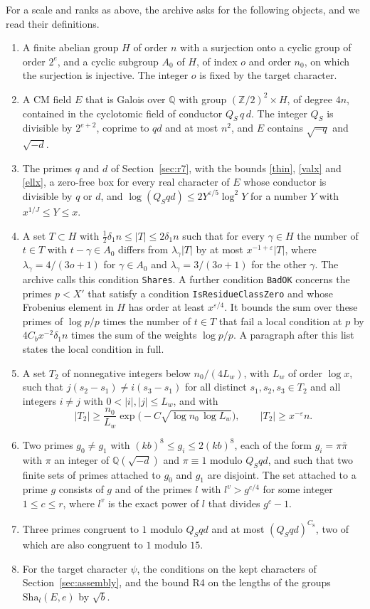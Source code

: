\documentclass[11pt,letterpaper]{article}
\numberwithin{equation}{section}
\newcommand{\Sha}{\mathrm{Sha}}
\begin{document}
For a scale and ranks as above, the archive asks for the following objects, and we read their definitions.
\begin{enumerate}
\item A finite abelian group $H$ of order $n$ with a surjection onto a cyclic group of order $2^e$, and a cyclic subgroup $A_0$ of $H$, of index $o$ and order $n_0$, on which the surjection is injective. The integer $o$ is fixed by the target character.
\item A CM field $E$ that is Galois over $\mathbb Q$ with group $(\mathbb Z/2)^2\times H$, of degree $4n$, contained in the cyclotomic field of conductor $Q_S\,q\,d$. The integer $Q_S$ is divisible by $2^{e+2}$, coprime to $qd$ and at most $n^2$, and $E$ contains $\sqrt{-q}$ and $\sqrt{-d}$.
\item The primes $q$ and $d$ of Section~\ref{sec:r7}, with the bounds \eqref{thin}, \eqref{valx} and \eqref{ellx}, a zero-free box for every real character of $E$ whose conductor is divisible by $q$ or $d$, and $\log(Q_Sqd)\le2Y^{\varepsilon/5}\log^2Y$ for a number $Y$ with $x^{1/J}\le Y\le x$.
\item A set $T\subset H$ with $\tfrac12\delta_1n\le|T|\le2\delta_1n$ such that for every $\gamma\in H$ the number of $t\in T$ with $t-\gamma\in A_0$ differs from $\lambda_\gamma|T|$ by at most $x^{-1+\varepsilon}|T|$, where $\lambda_\gamma=4/(3o+1)$ for $\gamma\in A_0$ and $\lambda_\gamma=3/(3o+1)$ for the other $\gamma$. The archive calls this condition \texttt{Shares}. A further condition \texttt{BadOK} concerns the primes $p<X'$ that satisfy a condition \texttt{IsResidueClassZero} and whose Frobenius element in $H$ has order at least $x^{\varepsilon/4}$. It bounds the sum over these primes of $\log p/p$ times the number of $t\in T$ that fail a local condition at $p$ by $4C_bx^{-2}\delta_1n$ times the sum of the weights $\log p/p$. A paragraph after this list states the local condition in full.
\item A set $T_2$ of nonnegative integers below $n_0/(4L_w)$, with $L_w$ of order $\log x$, such that $j(s_2-s_1)\ne i(s_3-s_1)$ for all distinct $s_1,s_2,s_3\in T_2$ and all integers $i\ne j$ with $0<|i|,|j|\le L_w$, and with
\[
|T_2|\ge\frac{n_0}{L_w}\exp\Big(-C\sqrt{\log n_0\,\log L_w}\Big),\qquad|T_2|\ge x^{-\varepsilon}n .
\]
\item Two primes $g_0\ne g_1$ with $(kb)^8\le g_i\le2(kb)^8$, each of the form $g_i=\pi\bar\pi$ with $\pi$ an integer of $\mathbb Q(\sqrt{-d})$ and $\pi\equiv1$ modulo $Q_Sqd$, and such that two finite sets of primes attached to $g_0$ and $g_1$ are disjoint. The set attached to a prime $g$ consists of $g$ and of the primes $l$ with $l^{v}>g^{c/4}$ for some integer $1\le c\le r$, where $l^{v}$ is the exact power of $l$ that divides $g^{c}-1$.
\item Three primes congruent to $1$ modulo $Q_Sqd$ and at most $(Q_Sqd)^{C_8}$, two of which are also congruent to $1$ modulo $15$.
\item For the target character $\psi$, the conditions on the kept characters of Section~\ref{sec:assembly}, and the bound R4 on the lengths of the groups $\Sha_l(E,e)$ by $\sqrt b$.
\end{enumerate}
\end{document}
